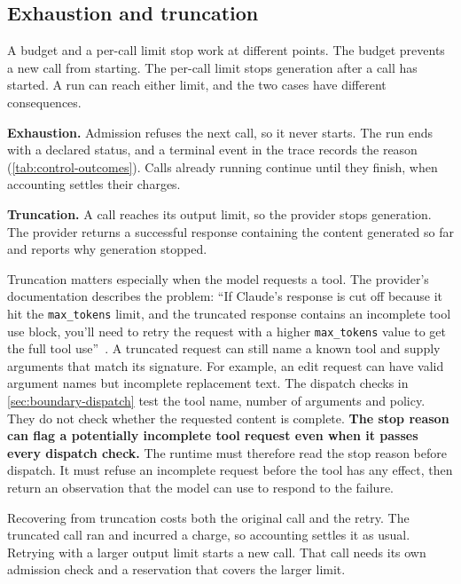 \subsection{Exhaustion and truncation}
\label{sec:budgets-limits}

A budget and a per-call limit stop work at different points. The budget prevents a new call from
starting. The per-call limit stops generation after a call has started. A run can reach either
limit, and the two cases have different consequences.

\bi

\item \textbf{Exhaustion.} Admission refuses the next call, so it never starts. The run ends with
a declared status, and a terminal event in the trace records the reason
(\cref{tab:control-outcomes}). Calls already running continue until they finish, when accounting
settles their charges.

\item \textbf{Truncation.} A call reaches its output limit, so the provider stops generation. The
provider returns a successful response containing the content generated so far and reports why
generation stopped.

\ei

Truncation matters especially when the model requests a tool. The provider's documentation
describes the problem:
``If Claude's response is cut off because it hit the \texttt{max\_tokens} limit,
and the truncated response contains an incomplete tool use block, you'll need to retry the request
with a higher \texttt{max\_tokens} value to get the full tool use''~\citep{anthropic-stop-reasons}.
A truncated request can still name a known tool and supply arguments that match its signature.
For example, an edit request can have valid argument names but incomplete replacement text. The
dispatch checks in \cref{sec:boundary-dispatch} test the tool name, number of arguments and policy.
They do not check whether the requested content is complete.
\textbf{The stop reason can flag a potentially incomplete tool request even when it passes every
dispatch check.} The runtime must therefore read the stop reason before dispatch. It must refuse
an incomplete request before the tool has any effect, then return an observation that the model
can use to respond to the failure.

Recovering from truncation costs both the original call and the retry. The truncated call ran
and incurred a charge, so accounting settles it as usual. Retrying with a larger output limit
starts a new call. That call needs its own admission check and a reservation that covers the
larger limit.

